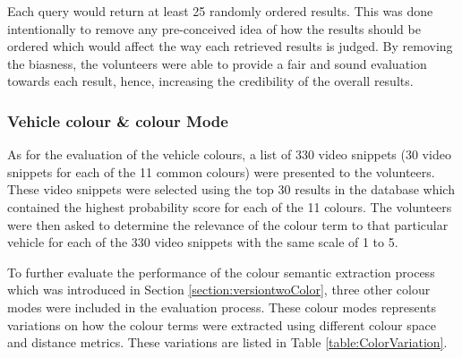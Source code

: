 Each query would return at least 25 randomly ordered results. This was done
intentionally to remove any pre-conceived idea of how the results should be
ordered which would affect the way each retrieved results is judged. By removing
the biasness, the volunteers were able to provide a fair and sound evaluation
towards each result, hence, increasing the credibility of the overall results.


\subsubsection{Vehicle colour \& colour Mode}
\label{subsec:vehColor}
As for the evaluation of the vehicle colours, a list of 330 video snippets (30
video snippets for each of the 11 common colours) were presented to the
volunteers. These video snippets were selected using the top 30 results in the
database which contained the highest probability score for each of the 11
colours. The volunteers were then asked to determine the relevance of the colour
term to that particular vehicle for each of the 330 video snippets with the same
scale of 1 to 5.

To further evaluate the performance of the colour semantic extraction process
which was introduced in Section \ref{section:versiontwoColor}, three other
colour modes were included in the evaluation process. These colour modes
represents variations on how the colour terms were extracted using different colour space and distance metrics. These variations are listed in Table \ref{table:ColorVariation}.


